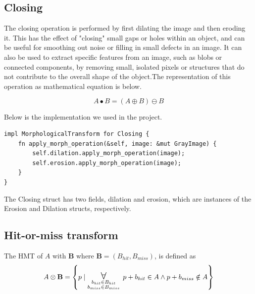 \documentclass[12pt]{article}
\begin{document}
\subsection{Closing}

The closing operation is performed by first dilating the image and then eroding it. This has the effect of "closing" small gaps or holes within an object, and can be useful for smoothing out noise or filling in small defects in an image. It can also be used to extract specific features from an image, such as blobs or connected components, by removing small, isolated pixels or structures that do not contribute to the overall shape of the object.The representation of this operation as mathematical equation is below.

\begin{equation}
   A \bullet B  = ( A \oplus B )\ominus B
\end{equation}

Below is the implementation we used in the project.
\begin{lstlisting}
impl MorphologicalTransform for Closing {
    fn apply_morph_operation(&self, image: &mut GrayImage) {
    	self.dilation.apply_morph_operation(image);
        self.erosion.apply_morph_operation(image);
    }
}
\end{lstlisting}

The Closing struct has two fields, dilation and erosion, which are instances of the Erosion and Dilation structs, respectively.
\subsection{Hit-or-miss transform}

The HMT of $A$ with $\mathbf{B}$ where $\mathbf{B} = (B_{hit},B_{miss})$, is defined as
\begin{equation}
    A \otimes \mathbf{B} = \left\{ p \mid \biggerforall\limits_{\substack{b_{hit} \in B_{hit} \\ b_{miss} \in B_{miss}}}\; p + b_{hit} \in A \land p + b_{miss} \notin A  \right\}
\end{equation}
\end{document}
